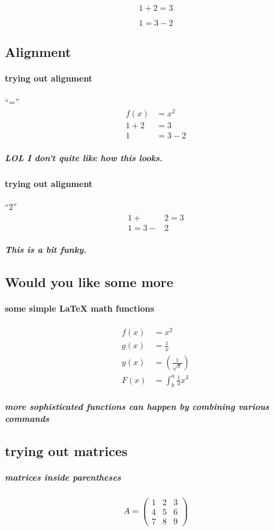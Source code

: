 \documentclass[a4paper, 12pt]{article}
\begin{document}
\begin{equation*}
  1 + 2 = 3 
\end{equation*}

\begin{equation*}
  1 = 3 - 2
\end{equation*}

\subsection{Alignment}
\paragraph{trying out alignment} ``=''
\begin{align*}
    f(x) &= x^2\\
    1 + 2 &= 3\\
  1 &= 3 - 2
\end{align*}
\subparagraph{LOL I don't quite like how this looks.}

\paragraph{trying out alignment} ``2''
\begin{align*}
    1 + &2 = 3\\
  1 = 3 - &2
\end{align*}
\subparagraph{This is a bit funky.}


\subsection{Would you like some more}
\paragraph{some simple LaTeX math functions}
\begin{align*}
  f(x) &= x^2\\
  g(x) &= \frac{1}{x}\\
  y(x) &= \left(\frac{1}{\sqrt{x}}\right)\\
  F(x) &= \int^a_b \frac{1}{3}x^3
\end{align*}
\subparagraph{more sophisticated functions can happen by combining various commands}



\subsection{trying out matrices}
\subparagraph{matrices inside parentheses}
\begin{equation*}
A = 
\begin{pmatrix}
1 & 2 & 3 \\
4 & 5 & 6 \\
7 & 8 & 9
\end{pmatrix}
\end{equation*}
\end{document}
